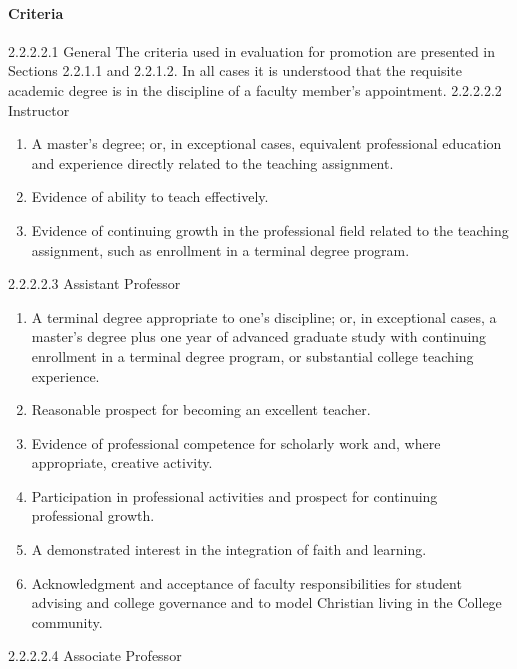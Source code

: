 \documentclass[letterpaper, 11pt]{article}
\begin{document}
			\paragraph{Criteria}
				2.2.2.2.1 General
				The criteria used in evaluation for promotion are presented in Sections 2.2.1.1 and 2.2.1.2. In all cases it is understood that the requisite academic degree is in the discipline of a faculty member's appointment.
				2.2.2.2.2 Instructor
				\begin{enumerate}[label=\alph*)]
					\item{A master's degree; or, in exceptional cases, equivalent professional education and experience directly related to the teaching assignment.}
					\item{Evidence of ability to teach effectively.}
					\item{Evidence of continuing growth in the professional field related to the teaching assignment, such as enrollment in a terminal degree program.}
				\end{enumerate}
				2.2.2.2.3 Assistant Professor
				\begin{enumerate}[label=\alph*)]
					\item{A terminal degree appropriate to one's discipline; or, in exceptional cases, a master's degree plus one year of advanced graduate study with continuing enrollment in a terminal degree program, or substantial college teaching experience.}
					\item{Reasonable prospect for becoming an excellent teacher.}
					\item{Evidence of professional competence for scholarly work and, where appropriate, creative activity.}
					\item{Participation in professional activities and prospect for continuing professional growth.}
					\item{A demonstrated interest in the integration of faith and learning.}
					\item{Acknowledgment and acceptance of faculty responsibilities for student advising and college governance and to model Christian living in the College community.}
				\end{enumerate}
				2.2.2.2.4 Associate Professor
\end{document}
